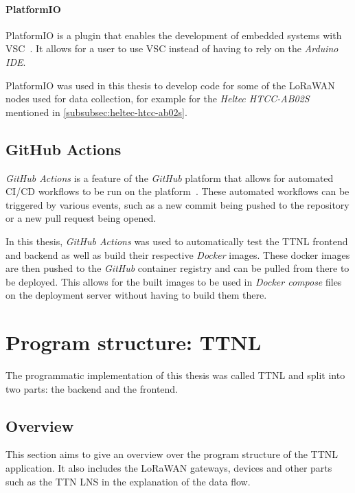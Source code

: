 \paragraph{PlatformIO}

PlatformIO is a plugin that enables the development of embedded systems with \ac{VSC}~\cite{platformio_platformio_nodate}.
It allows for a user to use \ac{VSC} instead of having to rely on the \emph{Arduino IDE}.

PlatformIO was used in this thesis to develop code for some of the \ac{LoRaWAN} nodes used for data collection, for example for the \emph{Heltec HTCC-AB02S} mentioned in \cref{subsubsec:heltec-htcc-ab02s}.

\subsection{GitHub Actions}

\emph{GitHub Actions} is a feature of the \emph{GitHub} platform that allows for automated \ac{CI/CD} workflows to be run on the platform~\cite{github_inc_features_2023}.
These automated workflows can be triggered by various events, such as a new commit being pushed to the repository or a new pull request being opened.

In this thesis, \emph{GitHub Actions} was used to automatically test the \ac{TTNL} frontend and backend as well as build their respective \emph{Docker} images.
These docker images are then pushed to the \emph{GitHub} container registry and can be pulled from there to be deployed.
This allows for the built images to be used in \emph{Docker compose} files on the deployment server without having to build them there.

\section{Program structure: \acf{TTNL}}\label{section:ttnl}

The programmatic implementation of this thesis was called \acf{TTNL} and split into two parts: the backend and the frontend.

\subsection{Overview}

This section aims to give an overview over the program structure of the \ac{TTNL} application.
It also includes the \ac{LoRaWAN} gateways, devices and other parts such as the \ac{TTN} \ac{LNS} in the explanation of the data flow.

